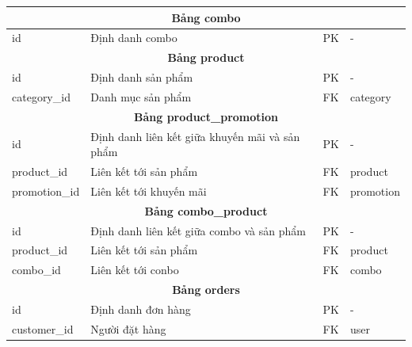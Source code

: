 \begin{longtable}{|l|p{6cm}|l|l|}
	\multicolumn{4}{|c|}{\textbf{Bảng combo}}                                                                               \\
	\hline
	id                      & Định danh combo                                & PK                 & -                       \\
	\hline

	\multicolumn{4}{|c|}{\textbf{Bảng product}}                                                                             \\
	\hline
	id                      & Định danh sản phẩm                             & PK                 & -                       \\
	category\_id            & Danh mục sản phẩm                              & FK                 & category                \\
	\hline

	\multicolumn{4}{|c|}{\textbf{Bảng product\_promotion}}                                                                  \\
	\hline
	id                      & Định danh liên kết giữa khuyến mãi và sản phẩm & PK                 & -                       \\
	product\_id             & Liên kết tới sản phẩm                          & FK                 & product                 \\
	promotion\_id           & Liên kết tới khuyến mãi                        & FK                 & promotion               \\
	\hline

	\multicolumn{4}{|c|}{\textbf{Bảng combo\_product}}                                                                      \\
	\hline
	id                      & Định danh liên kết giữa combo và sản phẩm      & PK                 & -                       \\
	product\_id             & Liên kết tới sản phẩm                          & FK                 & product                 \\
	combo\_id               & Liên kết tới conbo                             & FK                 & combo                   \\
	\hline

	\multicolumn{4}{|c|}{\textbf{Bảng orders}}                                                                              \\
	\hline
	id                      & Định danh đơn hàng                             & PK                 & -                       \\
	customer\_id            & Người đặt hàng                                 & FK                 & user                    \\
	\hline


\end{longtable}
